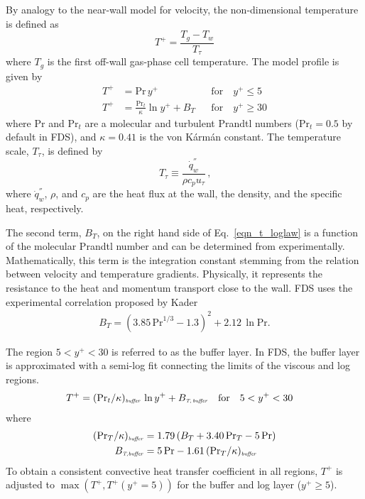 By analogy to the near-wall model for velocity, the non-dimensional temperature is defined as
\begin{equation}
T^+ = \frac{T_g - T_w}{T_\tau}
\end{equation}
where $T_g$ is the first off-wall gas-phase cell temperature.  The model profile is given by
\begin{align}
\label{eqn_t_visclayer} T^+ &= \mbox{Pr}\,y^+                            && \mbox{for} \quad y^+ \le 5 \\
\label{eqn_t_loglaw}    T^+ &= \frac{\mbox{Pr}_t}{\kappa} \ln y^+ + B_T  && \mbox{for} \quad y^+ \ge 30
\end{align}
where Pr and Pr$_t$ are a molecular and turbulent Prandtl numbers  (Pr$_t=0.5$ by default in FDS), and $\kappa = 0.41$ is the von K\'arm\'an constant.  The temperature scale, $T_{\tau}$, is defined by
\begin{equation}
\label{eqn_friction_temperature}
T_{\tau} \equiv \frac{\dot{q}_w^{''}}{{\rho}{c_p}{u_{\tau}}} \,\mbox{,}
\end{equation}
where $\dot{q}_w^{''}$, $\rho$, and $c_p$ are the heat flux at the wall, the density, and the specific heat, respectively.

The second term, $B_T$, on the right hand side of Eq.~\ref{eqn_t_loglaw} is a function of the molecular Prandtl number and can be determined from experimentally. Mathematically, this term is the integration constant stemming from the relation between velocity and temperature gradients. Physically, it represents the resistance to the heat and momentum transport close to the wall. FDS uses the experimental correlation proposed by Kader \cite{Kader:1981}
\begin{align}
\label{eqn_t_bt}
B_T =(3.85 \,\mbox{Pr}^{1/3}-1.3)^2 + 2.12 \,\ln\mbox{Pr}.
\end{align}

The region $5 < y^+ < 30$ is referred to as the buffer layer.  In FDS, the buffer layer is approximated with a semi-log fit connecting the limits of the viscous and log regions.
\begin{align}
\label{eqn_t_buffer_layer}
T^+ &= (\mbox{Pr}_t /\kappa)_{\mbox{\tiny\emph{buffer}}} \,\ln y^+ + B_{\mbox{\tiny\emph{T,\,buffer}}}  && \mbox{for} \quad 5 < y^+ < 30
\end{align}
where
\begin{align}
(\mbox{Pr}_T /\kappa)_{\mbox{\tiny\emph{buffer}}} &= 1.79\,(B_T + 3.40 \,\mbox{Pr}_T - 5 \,\mbox{Pr}) \\
B_{\mbox{\tiny\emph{T,buffer}}} &= 5 \,\mbox{Pr} - 1.61 \,(\mbox{Pr}_T /\kappa)_{\mbox{\tiny\emph{buffer}}}
\end{align}
To obtain a consistent convective heat transfer coefficient in all regions, $T^+$ is adjusted to $\max(T^+,T^+ (y^+ = 5))$ for the buffer and log layer ($y^+ \ge 5$).

